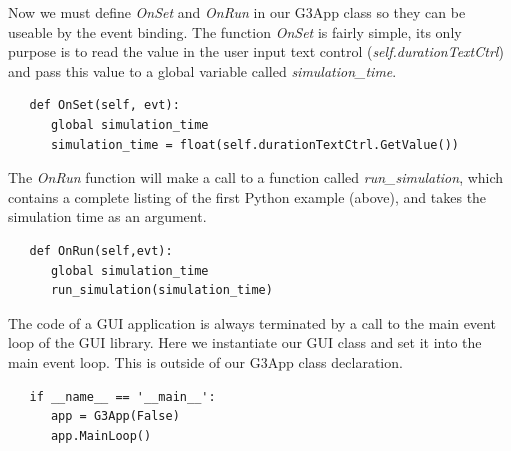\documentclass[12pt]{article}
\begin{document}
Now we must define {\it OnSet} and {\it OnRun} in our G3App class so
they can be useable by the event binding. The function {\it OnSet} 
is fairly simple, its only purpose is to read the value in the 
user input text control ({\it self.durationTextCtrl}) and pass this value
to a global variable called {\it simulation\_time}.

{\footnotesize
  \resetlinenumber[12]
  \linenumbers
\begin{verbatim}
   def OnSet(self, evt):
      global simulation_time
      simulation_time = float(self.durationTextCtrl.GetValue())
 \end{verbatim}
}

The {\it OnRun} function will make a call to a function called {\it run\_simulation},
which contains a complete listing of the first Python example (above), 
and takes the simulation time as an argument. 

{\footnotesize
  \resetlinenumber[15]
  \linenumbers
\begin{verbatim}
   def OnRun(self,evt):
      global simulation_time
      run_simulation(simulation_time)
\end{verbatim}
}
 

    

The code of a GUI application is always terminated by a call to the
main event loop of the GUI library. Here we instantiate our GUI class
and set it into the main event loop. This is outside of our G3App class
declaration.


 {\footnotesize
   \resetlinenumber[14]
   \linenumbers
 \begin{verbatim}
   if __name__ == '__main__':
      app = G3App(False)
      app.MainLoop()
 \end{verbatim}
 }
\end{document}
